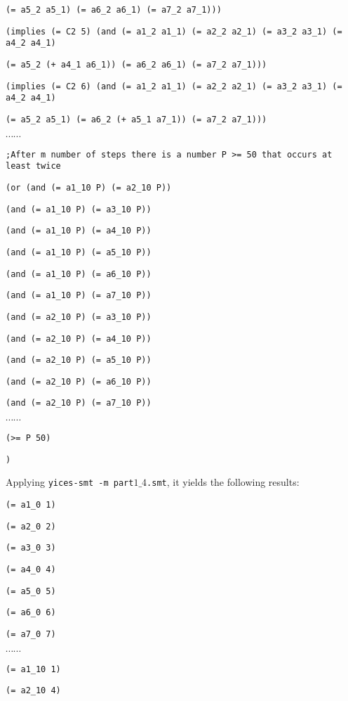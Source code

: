 {{\tt (= a5\_2 a5\_1) (= a6\_2 a6\_1) (= a7\_2 a7\_1)))}

{\tt (implies (= C2 5)  (and (= a1\_2 a1\_1) (= a2\_2 a2\_1) (= a3\_2 a3\_1) (= a4\_2 a4\_1)}

{\tt (= a5\_2 (+ a4\_1 a6\_1)) (= a6\_2 a6\_1) (= a7\_2 a7\_1)))}

{\tt (implies (= C2 6)  (and (= a1\_2 a1\_1) (= a2\_2 a2\_1) (= a3\_2 a3\_1) (= a4\_2 a4\_1)}

{\tt (= a5\_2 a5\_1) (= a6\_2 (+ a5\_1 a7\_1)) (= a7\_2 a7\_1)))}

$\cdots \cdots$

{\tt ;After m number of steps there is a number P >= 50 that occurs at least twice }

{\tt  (or  (and (= a1\_10 P) (= a2\_10 P))}

{\tt (and (= a1\_10 P) (= a3\_10 P))}

 {\tt (and (= a1\_10 P) (= a4\_10 P))}

 {\tt (and (= a1\_10 P) (= a5\_10 P))}

 {\tt (and (= a1\_10 P) (= a6\_10 P))}

 {\tt (and (= a1\_10 P) (= a7\_10 P))}

 {\tt (and (= a2\_10 P) (= a3\_10 P))}

 {\tt (and (= a2\_10 P) (= a4\_10 P))}

 {\tt (and (= a2\_10 P) (= a5\_10 P))}

 {\tt (and (= a2\_10 P) (= a6\_10 P))}

 {\tt (and (= a2\_10 P) (= a7\_10 P))}

$\cdots \cdots$

{\tt (>= P 50)}

{\tt )}

\vspace{3mm}

Applying {\tt yices-smt -m part$1\_4$.smt}, it yields the following results:

{\tt (= a1\_0 1)}

{\tt (= a2\_0 2)}

{\tt (= a3\_0 3)}

{\tt (= a4\_0 4)}

{\tt (= a5\_0 5)}

{\tt (= a6\_0 6)}

{\tt (= a7\_0 7)}

$\cdots \cdots$

{\tt (= a1\_10 1)}

{\tt (= a2\_10 4)}

}
